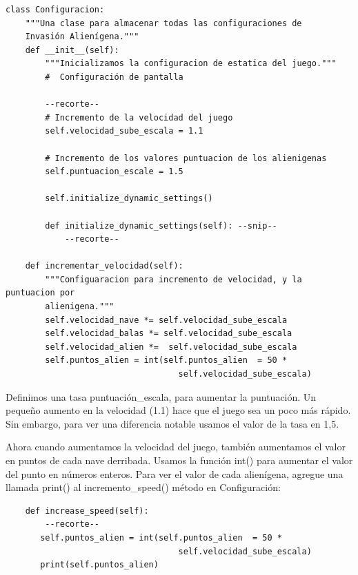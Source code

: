 \hspace{-2.75cm}{\ttfamily \scriptsize configurar.py}  \vspace{-0.5cm}
\begin{lstlisting}	
class Configuracion:
    """Una clase para almacenar todas las configuraciones de 
    Invasión Alienígena.""" 
    def __init__(self):
        """Inicializamos la configuracion de estatica del juego."""
        #  Configuración de pantalla    

        --recorte--
        # Incremento de la velocidad del juego
        self.velocidad_sube_escala = 1.1
    
        # Incremento de los valores puntuacion de los alienigenas  
        self.puntuacion_escale = 1.5 
    
        self.initialize_dynamic_settings() 
    
        def initialize_dynamic_settings(self): --snip--
            --recorte--	

    def incrementar_velocidad(self):
        """Configuaracion para incremento de velocidad, y la puntuacion por
        alienigena."""
        self.velocidad_nave *= self.velocidad_sube_escala
        self.velocidad_balas *= self.velocidad_sube_escala
        self.velocidad_alien *=  self.velocidad_sube_escala
        self.puntos_alien = int(self.puntos_alien  = 50 * 
                                   self.velocidad_sube_escala)	
\end{lstlisting}


Definimos una tasa {\ttfamily puntuación\_escala}, para aumentar la puntuación. Un pequeño aumento en la 
velocidad (1.1) hace que el juego sea un poco más rápido. Sin embargo, para ver una diferencia  notable usamos el valor de la tasa   en 1,5. 
 
Ahora cuando aumentamos la velocidad del juego, también aumentamos el valor en puntos de cada nave derribada.
Usamos la función {\ttfamily int()} para aumentar el valor del punto en números enteros. 
Para ver el valor de cada alienígena, agregue una llamada {\ttfamily print()} al incremento\_speed()
método en Configuración:

\hspace{-2.75cm}{\ttfamily \scriptsize configurar.py}  \vspace{-0.5cm}
\begin{lstlisting}
    def increase_speed(self):
        --recorte--	
       self.puntos_alien = int(self.puntos_alien  = 50 * 
                                   self.velocidad_sube_escala)	
       print(self.puntos_alien)
\end{lstlisting}


